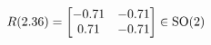 \documentclass[preview]{standalone}
\begin{document}
\begin{align*}
\special{dvisvgm:raw <g id='unique000'>}R(2.36) = \begin{bmatrix} -0.71 & -0.71 \\ 0.71 & -0.71 \end{bmatrix} \in \text{SO}(2)\special{dvisvgm:raw </g>}
\end{align*}
\end{document}
